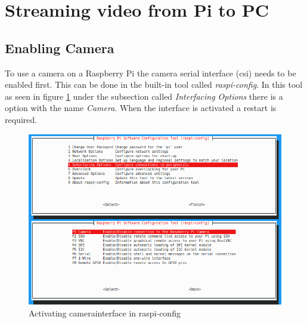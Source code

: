\section{Streaming video from Pi to PC\authorA}

\subsection{Enabling Camera}
To use a camera on a Raspberry Pi the camera serial interface (\gls{csi}) needs to be enabled first. This can be done in the built-in tool called \textit{raspi-config}. In this tool as seen in figure \ref{img:raspiconfig} under the subsection called \textit{Interfacing Options} there is a option with the name \textit{Camera}. When the interface is activated a restart is required.\newline
\begin{figure}[h]
	\centering
	\includegraphics[height=0.5\textwidth]{./media/images/raspiconfig.png}
  	\caption{Activating camerainterface in raspi-config}
  	\label{img:raspiconfig}
\end{figure}

